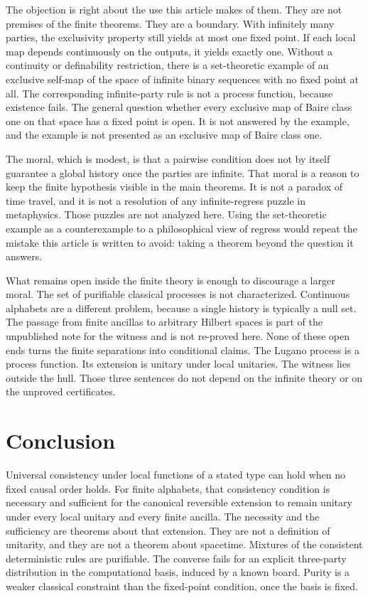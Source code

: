 \documentclass[11pt]{article}
\begin{document}
The objection is right about the use this article makes of them. They are not premises of the finite theorems. They are a boundary. With infinitely many parties, the exclusivity property still yields at most one fixed point. If each local map depends continuously on the outputs, it yields exactly one. Without a continuity or definability restriction, there is a set-theoretic example of an exclusive self-map of the space of infinite binary sequences with no fixed point at all. The corresponding infinite-party rule is not a process function, because existence fails. The general question whether every exclusive map of Baire class one on that space has a fixed point is open. It is not answered by the example, and the example is not presented as an exclusive map of Baire class one.

The moral, which is modest, is that a pairwise condition does not by itself guarantee a global history once the parties are infinite. That moral is a reason to keep the finite hypothesis visible in the main theorems. It is not a paradox of time travel, and it is not a resolution of any infinite-regress puzzle in metaphysics. Those puzzles are not analyzed here. Using the set-theoretic example as a counterexample to a philosophical view of regress would repeat the mistake this article is written to avoid: taking a theorem beyond the question it answers.

What remains open inside the finite theory is enough to discourage a larger moral. The set of purifiable classical processes is not characterized. Continuous alphabets are a different problem, because a single history is typically a null set. The passage from finite ancillas to arbitrary Hilbert spaces is part of the unpublished note for the witness and is not re-proved here. None of these open ends turns the finite separations into conditional claims. The Lugano process is a process function. Its extension is unitary under local unitaries. The witness lies outside the hull. Those three sentences do not depend on the infinite theory or on the unproved certificates.

\section{Conclusion}
\label{sec:end}

Universal consistency under local functions of a stated type can hold when no fixed causal order holds. For finite alphabets, that consistency condition is necessary and sufficient for the canonical reversible extension to remain unitary under every local unitary and every finite ancilla. The necessity and the sufficiency are theorems about that extension. They are not a definition of unitarity, and they are not a theorem about spacetime. Mixtures of the consistent deterministic rules are purifiable. The converse fails for an explicit three-party distribution in the computational basis, induced by a known board. Purity is a weaker classical constraint than the fixed-point condition, once the basis is fixed.
\end{document}
